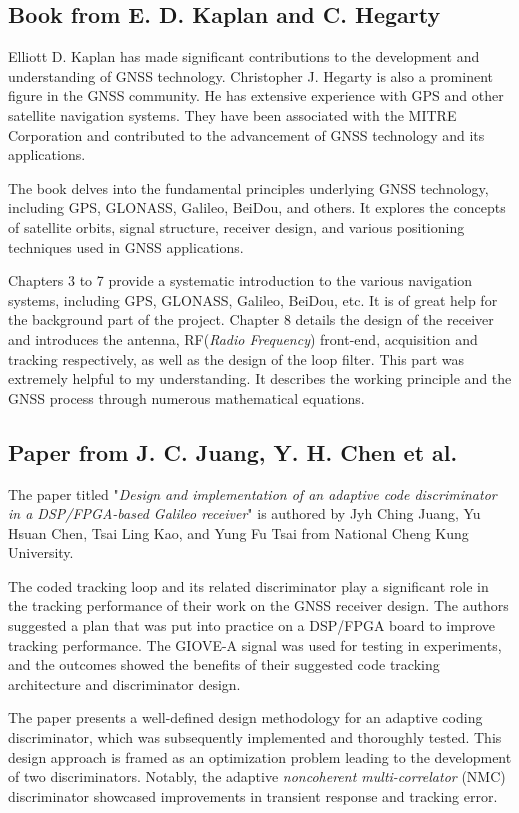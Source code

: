 \subsection{Book from E. D. Kaplan and C. Hegarty\texorpdfstring{\cite{RN177}}{}}
Elliott D. Kaplan has made significant contributions to the development and understanding of GNSS technology. Christopher J. Hegarty is also a prominent figure in the GNSS community. He has extensive experience with GPS and other satellite navigation systems. They have been associated with the MITRE Corporation and contributed to the advancement of GNSS technology and its applications.

The book delves into the fundamental principles underlying GNSS technology, including GPS, GLONASS, Galileo, BeiDou, and others. It explores the concepts of satellite orbits, signal structure, receiver design, and various positioning techniques used in GNSS applications.

Chapters 3 to 7 provide a systematic introduction to the various navigation systems, including GPS, GLONASS, Galileo, BeiDou, etc. It is of great help for the background part of the project. Chapter 8 details the design of the receiver and introduces the antenna, RF(\textit{Radio Frequency}) front-end, acquisition and tracking respectively, as well as the design of the loop filter. This part was extremely helpful to my understanding. It describes the working principle and the GNSS process through numerous mathematical equations.

\subsection{Paper from J. C. Juang, Y. H. Chen et al.\texorpdfstring{\cite{RN147}}{}}
The paper titled "\textit{Design and implementation of an adaptive code discriminator in a DSP/FPGA-based Galileo receiver}" is authored by Jyh Ching Juang, Yu Hsuan Chen, Tsai Ling Kao, and Yung Fu Tsai from National Cheng Kung University.

The coded tracking loop and its related discriminator play a significant role in the tracking performance of their work on the GNSS receiver design. The authors suggested a plan that was put into practice on a DSP/FPGA board to improve tracking performance. The GIOVE-A signal was used for testing in experiments, and the outcomes showed the benefits of their suggested code tracking architecture and discriminator design.

The paper presents a well-defined design methodology for an adaptive coding discriminator, which was subsequently implemented and thoroughly tested. This design approach is framed as an optimization problem leading to the development of two discriminators. Notably, the adaptive \textit{noncoherent multi-correlator} (NMC) discriminator showcased improvements in transient response and tracking error.

